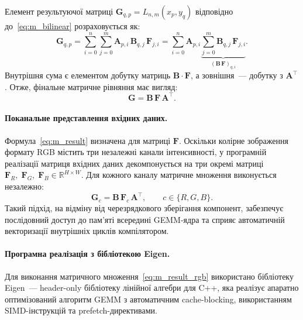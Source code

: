 Елемент результуючої матриці $\mathbf{G}_{q,p} = L_{n,m}(x_p, y_q)$ відповідно до~\eqref{eq:m_bilinear} розраховується як:
\begin{equation*}
	\mathbf{G}_{q,p} = \sum\limits_{i=0}^{n}\sum\limits_{j=0}^{m} \mathbf{A}_{p,i}\, \mathbf{B}_{q,j}\, \mathbf{F}_{j,i}
	= \sum\limits_{i=0}^{n} \mathbf{A}_{p,i} \underbrace{\sum\limits_{j=0}^{m} \mathbf{B}_{q,j}\, \mathbf{F}_{j,i}} _{(\mathbf{B}\,\mathbf{F})_{q,i}}.
\end{equation*}
Внутрішня сума є елементом добутку матриць $\mathbf{B} \cdot \mathbf{F}$, а зовнішня~--- добутку з $\mathbf{A}^{\!\top}$. Отже, фінальне матричне рівняння має вигляд:
\begin{equation}\label{eq:m_result}
	\mathbf{G} = \mathbf{B}\, \mathbf{F}\, \mathbf{A}^{\!\top}.
\end{equation}

\paragraph{Поканальне представлення вхідних даних.}
Формула~\eqref{eq:m_result} визначена для матриці
$\mathbf{F}$. Оскільки колірне зображення формату RGB містить три
незалежні канали інтенсивності, у програмній реалізації матриця вхідних
даних декомпонується на три окремі матриці
$\mathbf{F}_R,\; \mathbf{F}_G,\; \mathbf{F}_B \in \mathbb{R}^{H \times W}$. Для кожного каналу матричне
множення виконується незалежно:
\begin{equation}\label{eq:m_result_rgb}
	\mathbf{G}_c = \mathbf{B}\, \mathbf{F}_c\, \mathbf{A}^{\!\top},
	\qquad c \in \{R, G, B\}.
\end{equation}
Такий підхід, на відміну від черезрядкового зберігання компонент, забезпечує послідовний доступ до пам'яті
всередині GEMM-ядра та сприяє автоматичній векторизації внутрішніх циклів
компілятором.

\paragraph{Програмна реалізація з бібліотекою Eigen.}
Для виконання матричного множення~\eqref{eq:m_result_rgb} використано
бібліотеку Eigen~--- header-only бібліотеку лінійної алгебри для C++, яка
реалізує апаратно оптимізований алгоритм GEMM
з автоматичним cache-blocking, використанням SIMD-інструкцій та
prefetch-директивами.

